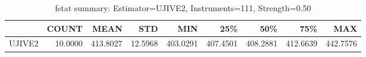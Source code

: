 \begin{table}[ht]
\centering
\caption{fstat summary: Estimator=UJIVE2, Instruments=111, Strength=0.50}
\begin{tabular}{lrrrrrrrr}
\toprule
 & COUNT & MEAN & STD & MIN & 25\% & 50\% & 75\% & MAX \\
\midrule
UJIVE2 & 10.0000 & 413.8027 & 12.5968 & 403.0291 & 407.4501 & 408.2881 & 412.6639 & 442.7576 \\
\bottomrule
\end{tabular}
\end{table}
